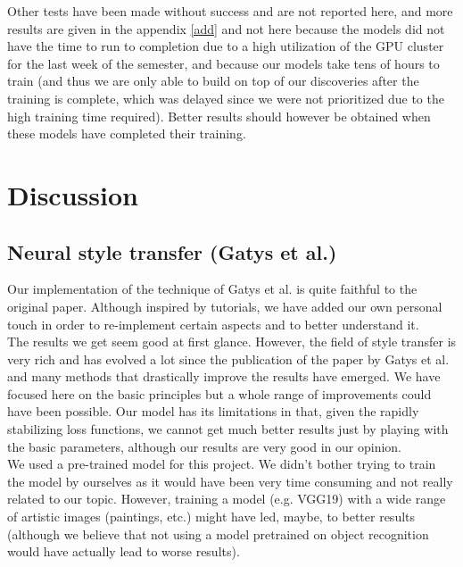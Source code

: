 \documentclass[twocolumn,superscriptaddress,aps,floatfix, nofootinbib]{revtex4-1}
\begin{document}
    Other tests have been made without success and are not reported here, and more results are given in the appendix \ref{add} and not here because the models did not have the time to run to completion due to a high utilization of the GPU cluster for the last week of the semester, and because our models take tens of hours to train (and thus we are only able to build on top of our discoveries after the training is complete, which was delayed since we were not prioritized due to the high training time required). Better results should however be obtained when these models have completed their training.
    
    
    
    
    
    \section{Discussion}\label{sec:discussion}
    
    \subsection{Neural style transfer (Gatys et al.)}
    
    Our implementation of the technique of Gatys et al. is quite faithful to the original paper. Although inspired by tutorials, we have added our own personal touch in order to re-implement certain aspects and to better understand it.\\
    
    The results we get seem good at first glance. However, the field of style transfer is very rich and has evolved a lot since the publication of the paper by Gatys et al. \cite{DBLP:journals/corr/GatysEB15a} and many methods that drastically improve the results have emerged. We have focused here on the basic principles but a whole range of improvements could have been possible. Our model has its limitations in that, given the rapidly stabilizing loss functions, we cannot get much better results just by playing with the basic parameters, although our results are very good in our opinion.\\
    
    We used a pre-trained model for this project. We didn't bother trying to train the model by ourselves as it would have been very time consuming and not really related to our topic. However, training a model (e.g. VGG19) with a wide range of artistic images (paintings, etc.) might have led, maybe, to better results (although we believe that not using a model pretrained on object recognition would have actually lead to worse results).\\
    
\end{document}
